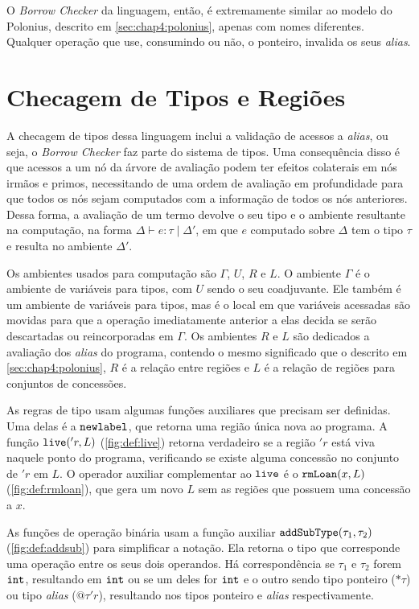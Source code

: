 O \emph{Borrow Checker} da linguagem, então, é extremamente similar ao modelo do Polonius, descrito em \ref{sec:chap4:polonius}, apenas com nomes diferentes. Qualquer operação que use, consumindo ou não, o ponteiro, invalida os seus \emph{alias}.
\section{Checagem de Tipos e Regiões}

A checagem de tipos dessa linguagem inclui a validação de acessos a \emph{alias}, ou seja, o \emph{Borrow Checker} faz parte do sistema de tipos. Uma consequência disso é que acessos a um nó da árvore de avaliação podem ter efeitos colaterais em nós irmãos e primos, necessitando de uma ordem de avaliação em profundidade para que todos os nós sejam computados com a informação de todos os nós anteriores. Dessa forma, a avaliação de um termo devolve o seu tipo e o ambiente resultante na computação, na forma $\Delta \vdash e : \tau\;|\;\Delta'$, em que $e$ computado sobre $\Delta$ tem o tipo $\tau$ e resulta no ambiente $\Delta'$.

Os ambientes usados para computação são $\Gamma$, $U$, $R$ e $L$. O ambiente $\Gamma$ é o ambiente de variáveis para tipos, com $U$ sendo o seu coadjuvante. Ele também é um ambiente de variáveis para tipos, mas é o local em que variáveis acessadas são movidas para que a operação imediatamente anterior a elas decida se serão descartadas ou reincorporadas em $\Gamma$. Os ambientes $R$ e $L$ são dedicados a avaliação dos \emph{alias} do programa, contendo o mesmo significado que o descrito em \ref{sec:chap4:polonius}, $R$ é a relação entre regiões e $L$ é a relação de regiões para conjuntos de concessões. 

As regras de tipo usam algumas funções auxiliares que precisam ser definidas. Uma delas é a $\texttt{newlabel}$, que retorna uma região única nova ao programa. A função $\texttt{live}('r, L)$ (\ref{fig:def:live}) retorna verdadeiro se a região $'r$ está viva naquele ponto do programa, verificando se existe alguma concessão no conjunto de $'r$ em $L$. O operador auxiliar complementar ao $\texttt{live}$ é o $\texttt{rmLoan}(x, L)$ (\ref{fig:def:rmloan}), que gera um novo $L$ sem as regiões que possuem uma concessão a $x$.

As funções de operação binária usam a função auxiliar $\texttt{addSubType}(\tau_1, \tau_2)$ (\ref{fig:def:addsub}) para simplificar a notação. Ela retorna o tipo que corresponde uma operação entre os seus dois operandos. Há correspondência se $\tau_1$ e $\tau_2$ forem $\texttt{int}$, resultando em $\texttt{int}$ ou se um deles for $\texttt{int}$ e o outro sendo tipo ponteiro ($\text{*}\!\tau$) ou tipo \emph{alias} ($@\tau'r$), resultando nos tipos ponteiro e \emph{alias} respectivamente. 

